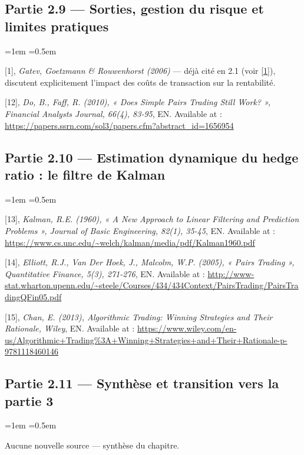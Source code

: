\documentclass{article}
\begin{document}
\subsection*{Partie 2.9 --- Sorties, gestion du risque et limites pratiques}
\begin{list}{}{\leftmargin=1em \itemsep=0.5em}
\item \hypertarget{ref1}{} [1], \textit{Gatev, Goetzmann \& Rouwenhorst (2006)} --- déjà cité en 2.1 (voir \hyperlink{ref1}{[1]}), discutent explicitement l'impact des coûts de transaction sur la rentabilité.
\item \hypertarget{ref12}{} [12], \textit{Do, B., Faff, R. (2010), « Does Simple Pairs Trading Still Work? », Financial Analysts Journal, 66(4), 83-95}, EN. Available at : \url{https://papers.ssrn.com/sol3/papers.cfm?abstract_id=1656954}
\end{list}
\subsection*{Partie 2.10 --- Estimation dynamique du hedge ratio : le filtre de Kalman}
\begin{list}{}{\leftmargin=1em \itemsep=0.5em}
\item \hypertarget{ref13}{} [13], \textit{Kalman, R.E. (1960), « A New Approach to Linear Filtering and Prediction Problems », Journal of Basic Engineering, 82(1), 35-45}, EN. Available at : \url{https://www.cs.unc.edu/~welch/kalman/media/pdf/Kalman1960.pdf}
\item \hypertarget{ref14}{} [14], \textit{Elliott, R.J., Van Der Hoek, J., Malcolm, W.P. (2005), « Pairs Trading », Quantitative Finance, 5(3), 271-276}, EN. Available at : \url{http://www-stat.wharton.upenn.edu/~steele/Courses/434/434Context/PairsTrading/PairsTradingQFin05.pdf}
\item \hypertarget{ref15}{} [15], \textit{Chan, E. (2013), Algorithmic Trading: Winning Strategies and Their Rationale, Wiley}, EN. Available at : \url{https://www.wiley.com/en-us/Algorithmic+Trading%3A+Winning+Strategies+and+Their+Rationale-p-9781118460146}
\end{list}
\subsection*{Partie 2.11 --- Synthèse et transition vers la partie 3}
\begin{list}{}{\leftmargin=1em \itemsep=0.5em}
\item Aucune nouvelle source --- synthèse du chapitre.
\end{list}
\end{document}
